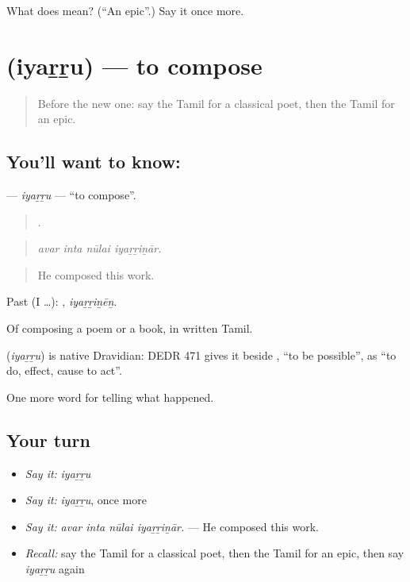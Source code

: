 \begin{tcolorbox}[breakable,colback=teal!4,colframe=teal!35!black,title={Before you move on}]
What does  mean? (\textquotedblleft{}An epic\textquotedblright{}.) Say it once more.
\end{tcolorbox}
\section[\texorpdfstring{\ta{இயற்று} (iyaṟṟu)}{இயற்று (iyaṟṟu)}]{ (iyaṟṟu) — to compose}

\label{lesson:TA-C325-iyarru}



\begin{quote}
Before the new one: say the Tamil for a classical poet, then the Tamil for an epic.
\end{quote}

\subsection*{You'll want to know: }
\textbf{} — \emph{iyaṟṟu} — \textquotedblleft{}to compose\textquotedblright{}.

\begin{quote}
   .
\end{quote}

\begin{quote}
\emph{avar inta nūlai iyaṟṟiṉār.}
\end{quote}

\begin{quote}
He composed this work.
\end{quote}

Past (I …): , \emph{iyaṟṟiṉēṉ}.

Of composing a poem or a book, in written Tamil.

\begin{cousinweb}
\textbf{} (\emph{iyaṟṟu}) is native Dravidian: DEDR 471 gives it beside , \textquotedblleft{}to be possible\textquotedblright{}, as \textquotedblleft{}to do, effect, cause to act\textquotedblright{}.
\end{cousinweb}

\begin{grammarlens}[title={What you've built}]
One more word for telling what happened.
\end{grammarlens}

\subsection*{Your turn}
\begin{itemize}
\raggedright
  \item \emph{Say it:} \emph{iyaṟṟu}
  \item \emph{Say it:} \emph{iyaṟṟu}, once more
  \item \emph{Say it:} \emph{avar inta nūlai iyaṟṟiṉār.} — He composed this work.
  \item \emph{Recall:} say the Tamil for a classical poet, then the Tamil for an epic, then say \emph{iyaṟṟu} again
\end{itemize}

